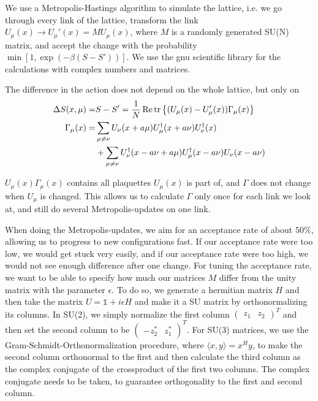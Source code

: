 \documentclass[%
 reprint,
 amsmath,amssymb,
 aps,
]{revtex4-1}
\renewcommand{\Re}{\operatorname{Re}}
\begin{document}
We use a Metropolis-Hastings algorithm to simulate the lattice, i.e. we go through every link of the lattice, transform the link $U_\mu(x)\to U_\mu'(x)=MU_\mu(x)$, where $M$ is a randomly generated SU(N) matrix, and accept the change with the probability $\min[1, \exp(-\beta(S-S'))]$. We use the gnu scientific library for the calculations with complex numbers and matrices.

The difference in the action does not depend on the whole lattice, but only on \begin{align*}
\Delta S(x, \mu)=&S-S'=\frac{1}{N}\Re\tr\left\lbrace (U_\mu(x)-U'_\mu(x))\Gamma_\mu(x)\right\rbrace\\
%
\Gamma_\mu(x)=&\sum_{\mu\neq\nu}U_\nu(x+a\mu)U_\mu^\dagger(x+a\nu)U_\nu^\dagger(x)\\
%
&+\sum_{\mu\neq\nu}U^\dagger_\nu(x-a\nu+a\mu) U^\dagger_\mu(x-a\nu)U_\nu(x-a\nu)
\end{align*}

$U_\mu(x)\Gamma_\mu(x)$ contains all plaquettes $U_\mu(x)$ is part of, and $\Gamma$ does not change when $U_\mu$ is changed. This allows us to calculate $\Gamma$ only once for each link we look at, and still do several Metropolis-updates on one link.

When doing the Metropolis-updates, we aim for an acceptance rate of about $50\%$, allowing us to progress to new configurations fast. If our acceptance rate were too low, we would get stuck very easily, and if our acceptance rate were too high, we would not see enough difference after one change.
For tuning the acceptance rate, we want to be able to specify how much our matrices $M$ differ from the unity matrix with the parameter $\epsilon$. To do so, we generate a hermitian matrix $H$   and then take the matrix $U=\mathbb{1}+i\epsilon H$ and make it a SU matrix by orthonormalizing its columns. In SU(2), we simply normalize the first column $\begin{pmatrix}z_1&z_2\end{pmatrix}^T$ and then set the second column to be $\begin{pmatrix}-z_2^*&z_1^*\end{pmatrix}^T$. For SU(3) matrices, we use the Gram-Schmidt-Orthonormalization procedure, where $\langle x,y\rangle=x^Hy$, to make the second column orthonormal to the first and then calculate the third column as the complex conjugate of the crossproduct of the first two columns. The complex conjugate needs to be taken, to guarantee orthogonality to the first and second column.
\end{document}
